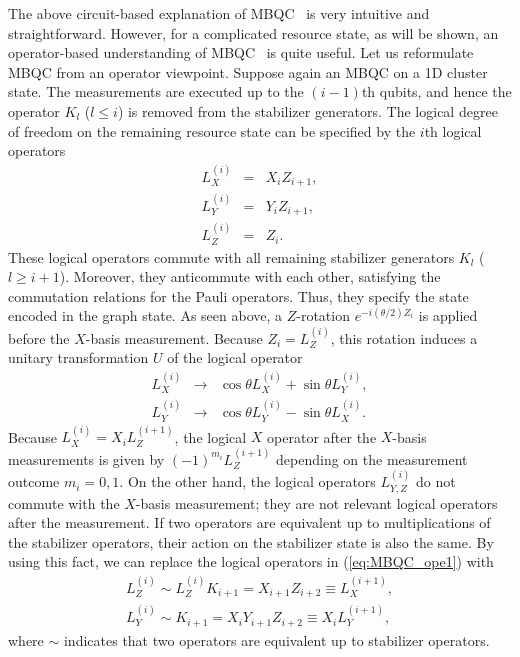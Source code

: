 The above circuit-based explanation of MBQC~\cite{NielsenCluster} is very intuitive and straightforward.
However, for a complicated resource state, as will be shown, an operator-based understanding of MBQC~\cite{MBQC_PRA} is quite useful.
Let us reformulate MBQC from an operator viewpoint.
Suppose again an MBQC on a 1D cluster state.
The measurements are executed up to the $(i-1)$th qubits, and hence the operator $K_l$ ($l \leq i$) is removed from the stabilizer generators.
The logical degree of freedom on the remaining resource state can be specified by the $i$th logical operators
\begin{eqnarray}
L_X^{(i)} &=&X_i Z_{i+1},
\\
L_Y^{(i)} &=&Y_i Z_{i+1},
\\
L_Z^{(i)} &=&Z_i.
\end{eqnarray}
These logical operators commute with all remaining stabilizer generators $K_l$ ($l \geq i+1$).
Moreover, they anticommute with each other, satisfying the commutation relations for the Pauli operators.
Thus, they specify the state encoded in the graph state.
As seen above, a $Z$-rotation $e^{-i (\theta/2) Z_i}$ is applied before the $X$-basis measurement.
Because $Z_i = L_Z^{(i)}$, this rotation induces a unitary transformation $U$ of the logical operator
\begin{eqnarray}
L_X^{(i)} &\rightarrow& \cos \theta L_X^{(i)} + \sin  \theta L_Y^{(i)},
\\
L_Y^{(i)} &\rightarrow& \cos \theta L_Y^{(i)} - \sin  \theta L_X^{(i)}.
\label{eq:MBQC_ope1}
\end{eqnarray}
Because $L_X^{(i)}=X_i L_Z^{(i+1)}$, the logical $X$ operator after the $X$-basis measurements is given by $(-1)^{m_i} L_Z^{(i+1)}$ depending on the measurement outcome $m_i =0,1$.
On the other hand, the logical operators $L_{Y,Z}^{(i)}$ do not commute with the $X$-basis measurement; they are not relevant logical operators after the measurement.
If two operators are equivalent up to multiplications of the stabilizer operators, their action on the stabilizer state is also the same.
By using this fact, we can replace the logical operators in (\ref{eq:MBQC_ope1}) with
\begin{eqnarray}
L_Z^{(i)} \sim L_Z^{(i)} K_{i+1} = X_{i+1}Z_{i+2} \equiv L_X^{(i+1)},
\\
L_Y^{(i)} \sim K_{i+1} = X_i Y_{i+1}Z_{i+2} \equiv X_i L_Y^{(i+1)},
\end{eqnarray}
where $\sim$ indicates that two operators are equivalent up to stabilizer operators.
